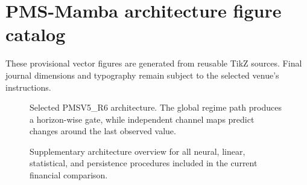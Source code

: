 \documentclass[11pt]{article}
\begin{document}
\section*{PMS-Mamba architecture figure catalog}

These provisional vector figures are generated from reusable TikZ sources. Final
journal dimensions and typography remain subject to the selected venue's instructions.

\begin{figure}[ht]
  \centering
  \resizebox{\textwidth}{!}{}
  \caption{Selected PMSV5\_R6 architecture. The global regime path produces a
  horizon-wise gate, while independent channel maps predict changes around the last
  observed value.}
\end{figure}

\clearpage

\begin{figure}[ht]
  \centering
  \resizebox{\textwidth}{!}{}
  \caption{Supplementary architecture overview for all neural, linear, statistical,
  and persistence procedures included in the current financial comparison.}
\end{figure}
\end{document}
